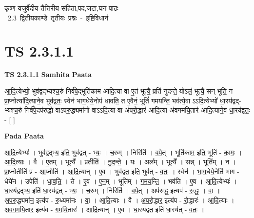 \documentclass[17pt]{extarticle}
\begin{document}
\begin{titlepage}
    \begin{center}
 
\begin{sanskrit}
    { \Huge
    कृष्ण यजुर्वेदीय तैत्तिरीय संहिता,पद,जटा,घन पाठः 
    }
    \\
    \vspace{2.5cm}
    \mbox{ \Huge
    2.3     द्वितीयकाण्डे तृतीयः प्रश्नः - इष्टिविधानं   }
\end{sanskrit}
\end{center}

\end{titlepage}
\tableofcontents
\pagebreak

\section*{ TS 2.3.1.1 }

\textbf{TS 2.3.1.1 } \newline
\textbf{Samhita Paata} \newline

आ॒दि॒त्येभ्यो॒ भुव॑द्वद्भ्यश्च॒रुं निर्व॑पे॒द्भूति॑काम आदि॒त्या वा ए॒तं भूत्यै॒ प्रति॑ नुदन्ते॒ योऽलं॒ भूत्यै॒ सन् भूतिं॒ न प्रा॒प्नोत्या॑दि॒त्याने॒व भुव॑द्वतः॒ स्वेन॑ भाग॒धेये॒नोप॑ धावति॒ त ए॒वैनं॒ भूतिं॑ गमयन्ति॒ भव॑त्ये॒वा ऽऽदि॒त्येभ्यो॑ धा॒रय॑द्वद्-भ्यश्च॒रुं निर्व॑पे॒दप॑रुद्धो वाऽपरु॒द्ध्यमा॑नो वाऽऽदि॒त्या वा अ॑परो॒द्धार॑ आदि॒त्या अ॑वगमयि॒तार॑ आदि॒त्याने॒व धा॒रय॑द्वतः॒ - [  ] \newline

\textbf{Pada Paata} \newline

आ॒दि॒त्येभ्यः॑ । भुव॑द्वद्भ्य॒ इति॒ भुव॑द्वत् - भ्यः॒ । च॒रुम् । निरिति॑ । व॒पे॒त् । भूति॑काम॒ इति॒ भूति॑ - का॒मः॒ । आ॒दि॒त्याः । वै । ए॒तम् । भूत्यै᳚ । प्रतीति॑ । नु॒द॒न्ते॒ । यः । अल᳚म् । भूत्यै᳚ । सन्न् । भूति᳚म् । न । प्रा॒प्नोतीति॑ प्र - आ॒प्नोति॑ । आ॒दि॒त्यान् । ए॒व । भुव॑द्वत॒ इति॒ भुव॑त् - व॒तः॒ । स्वेन॑ । भा॒ग॒धेये॒नेति॑ भाग - धेये॑न । उपेति॑ । धा॒व॒ति॒ । ते । ए॒व । ए॒न॒म् । भूति᳚म् । ग॒म॒य॒न्ति॒ । भव॑ति । ए॒व । आ॒दि॒त्येभ्यः॑ । धा॒रय॑द्वद्भ्य॒ इति॑ धा॒रय॑द्वत् - भ्यः॒ । च॒रुम् । निरिति॑ । व॒पे॒त् । अप॑रुद्ध॒ इत्यप॑ - रु॒द्धः॒ । वा॒ । अ॒प॒रु॒द्ध्यमा॑न॒ इत्य॑प - रु॒ध्यमा॑नः । वा॒ । आ॒दि॒त्याः । वै । अ॒प॒रो॒द्धार॒ इत्य॑प - रो॒द्धारः॑ । आ॒दि॒त्याः । अ॒व॒ग॒म॒यि॒तार॒ इत्य॑व - ग॒म॒यि॒तारः॑ । आ॒दि॒त्यान् । ए॒व । धा॒रय॑द्वत॒ इति॑ धा॒रय॑त् - व॒तः॒ ।  \newline
\end{document}
